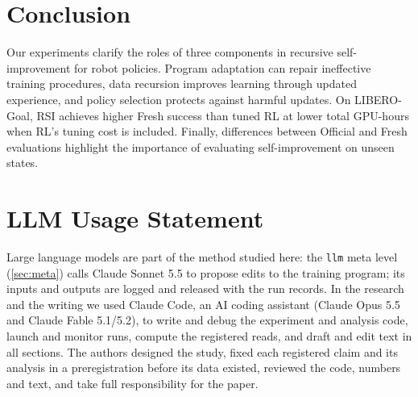 \section{Conclusion}
\label{sec:conclusion}

Our experiments clarify the roles of three components in recursive self-improvement for robot policies. Program adaptation can repair ineffective training procedures, data recursion improves learning through updated experience, and policy selection protects against harmful updates. On LIBERO-Goal, RSI achieves higher Fresh success than tuned RL at lower total GPU-hours when RL's tuning cost is included. Finally, differences between Official and Fresh evaluations highlight the importance of evaluating self-improvement on unseen states.

\clearpage
\section*{LLM Usage Statement}
Large language models are part of the method studied here: the \texttt{llm} meta level (\cref{sec:meta}) calls Claude Sonnet 5.5 to propose edits to the training program; its inputs and outputs are logged and released with the run records. In the research and the writing we used Claude Code, an AI coding assistant (Claude Opus 5.5 and Claude Fable 5.1/5.2), to write and debug the experiment and analysis code, launch and monitor runs, compute the registered reads, and draft and edit text in all sections. The authors designed the study, fixed each registered claim and its analysis in a preregistration before its data existed, reviewed the code, numbers and text, and take full responsibility for the paper.
